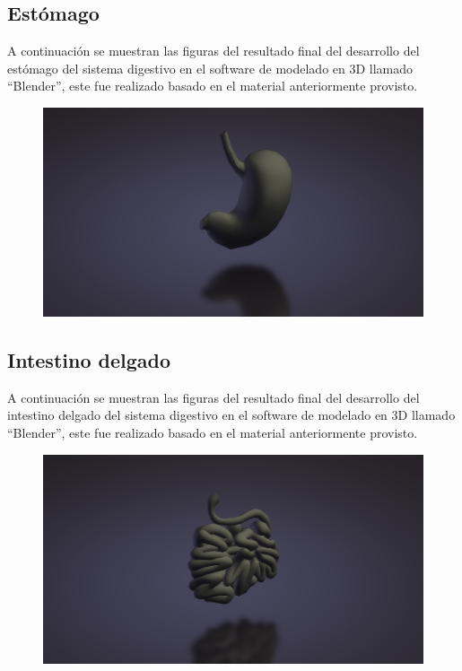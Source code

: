 \subsection{Estómago}
A continuación se muestran las figuras del resultado final del desarrollo del estómago del sistema digestivo en el software de modelado en 3D llamado “Blender”, este fue realizado basado en el material anteriormente provisto.\\
\begin{figure}[H]
	\begin{center}
 		\includegraphics[width = .5\textwidth]{source/images/image42.png}
	\end{center} 
\end{figure}

\subsection{Intestino delgado}
A continuación se muestran las figuras del resultado final del desarrollo del intestino delgado del sistema digestivo en el software de modelado en 3D llamado “Blender”, este fue realizado basado en el material anteriormente provisto.\\
\begin{figure}[H]
	\begin{center}
 		\includegraphics[width = .5\textwidth]{source/images/image69.png}
	\end{center} 
\end{figure}


